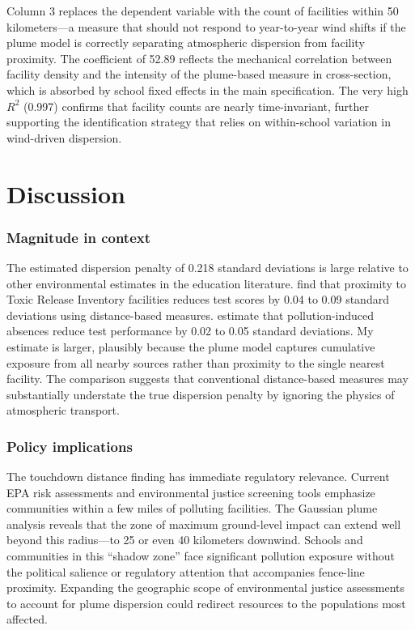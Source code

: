 \documentclass[12pt]{article}
\begin{document}
Column 3 replaces the dependent variable with the count of facilities within 50 kilometers---a measure that should not respond to year-to-year wind shifts if the plume model is correctly separating atmospheric dispersion from facility proximity. The coefficient of 52.89 reflects the mechanical correlation between facility density and the intensity of the plume-based measure in cross-section, which is absorbed by school fixed effects in the main specification. The very high $R^2$ (0.997) confirms that facility counts are nearly time-invariant, further supporting the identification strategy that relies on within-school variation in wind-driven dispersion.


\section{Discussion}

\subsubsection*{Magnitude in context} The estimated dispersion penalty of 0.218 standard deviations is large relative to other environmental estimates in the education literature. \citet{persico2021} find that proximity to Toxic Release Inventory facilities reduces test scores by 0.04 to 0.09 standard deviations using distance-based measures. \citet{currie2009} estimate that pollution-induced absences reduce test performance by 0.02 to 0.05 standard deviations. My estimate is larger, plausibly because the plume model captures cumulative exposure from all nearby sources rather than proximity to the single nearest facility. The comparison suggests that conventional distance-based measures may substantially understate the true dispersion penalty by ignoring the physics of atmospheric transport.

\subsubsection*{Policy implications} The touchdown distance finding has immediate regulatory relevance. Current EPA risk assessments and environmental justice screening tools emphasize communities within a few miles of polluting facilities. The Gaussian plume analysis reveals that the zone of maximum ground-level impact can extend well beyond this radius---to 25 or even 40 kilometers downwind. Schools and communities in this ``shadow zone'' face significant pollution exposure without the political salience or regulatory attention that accompanies fence-line proximity. Expanding the geographic scope of environmental justice assessments to account for plume dispersion could redirect resources to the populations most affected.
\end{document}
